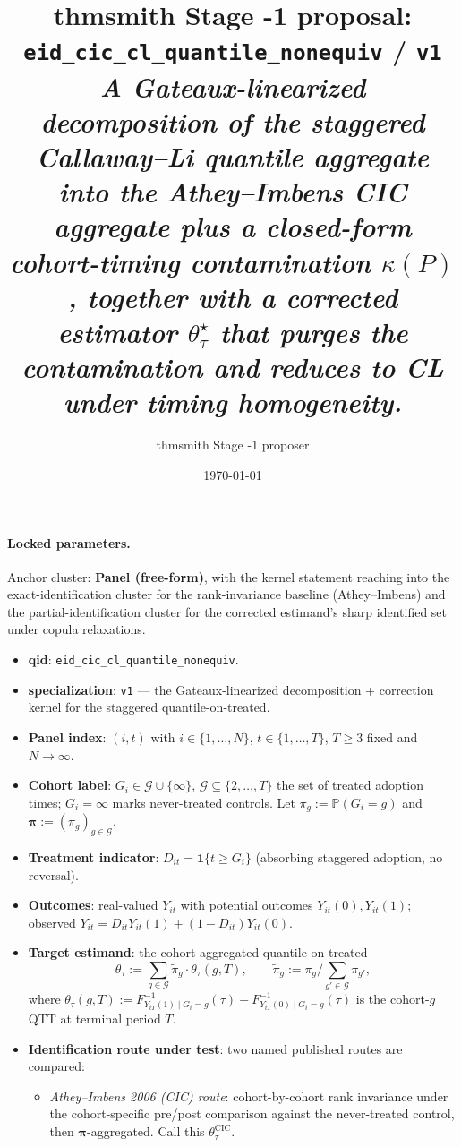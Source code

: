 \documentclass[11pt]{article}
\title{thmsmith Stage -1 proposal: \texttt{eid\_cic\_cl\_quantile\_nonequiv} / \texttt{v1}%
  \\ \large\textit{A Gateaux-linearized decomposition of the staggered Callaway--Li quantile aggregate into the Athey--Imbens CIC aggregate plus a closed-form cohort-timing contamination $\kappa(P)$, together with a corrected estimator $\theta^\star_\tau$ that purges the contamination and reduces to CL under timing homogeneity.}}
\author{thmsmith Stage -1 proposer}
\date{\today}
\renewcommand{\Pr}{\mathbb{P}}
\newcommand{\one}{\mathbf{1}}
\theoremstyle{definition}
\theoremstyle{plain}
\theoremstyle{remark}
\begin{document}
\maketitle


\paragraph{Locked parameters.}
Anchor cluster: \textbf{Panel (free-form)}, with the kernel statement reaching into the exact-identification cluster for the rank-invariance baseline (Athey--Imbens) and the partial-identification cluster for the corrected estimand's sharp identified set under copula relaxations.
\begin{itemize}
  \item \textbf{qid}: \texttt{eid\_cic\_cl\_quantile\_nonequiv}.
  \item \textbf{specialization}: \texttt{v1} --- the Gateaux-linearized decomposition + correction kernel for the staggered quantile-on-treated.
  \item \textbf{Panel index}: $(i,t)$ with $i \in \{1,\dots,N\}$, $t \in \{1,\dots,T\}$, $T \geq 3$ fixed and $N \to \infty$.
  \item \textbf{Cohort label}: $G_i \in \mathcal{G} \cup \{\infty\}$, $\mathcal{G} \subseteq \{2,\dots,T\}$ the set of treated adoption times; $G_i = \infty$ marks never-treated controls. Let $\pi_g := \Pr(G_i = g)$ and $\boldsymbol\pi := (\pi_g)_{g\in\mathcal{G}}$.
  \item \textbf{Treatment indicator}: $D_{it} = \one\{t \geq G_i\}$ (absorbing staggered adoption, no reversal).
  \item \textbf{Outcomes}: real-valued $Y_{it}$ with potential outcomes $Y_{it}(0), Y_{it}(1)$; observed $Y_{it} = D_{it} Y_{it}(1) + (1-D_{it}) Y_{it}(0)$.
  \item \textbf{Target estimand}: the cohort-aggregated quantile-on-treated
        \[ \theta_\tau := \sum_{g \in \mathcal{G}} \tilde\pi_g \cdot \theta_\tau(g,T), \qquad \tilde\pi_g := \pi_g / \sum_{g' \in \mathcal{G}} \pi_{g'}, \]
        where $\theta_\tau(g,T) := F^{-1}_{Y_{iT}(1)\mid G_i=g}(\tau) - F^{-1}_{Y_{iT}(0)\mid G_i=g}(\tau)$ is the cohort-$g$ QTT at terminal period $T$.
  \item \textbf{Identification route under test}: two named published routes are compared:
        \begin{itemize}
          \item[(A)] \emph{Athey--Imbens 2006 (CIC) route}: cohort-by-cohort rank invariance under the cohort-specific pre/post comparison against the never-treated control, then $\boldsymbol\pi$-aggregated. Call this $\theta^{\mathrm{CIC}}_\tau$.

\end{itemize}
\end{itemize}
\end{document}

